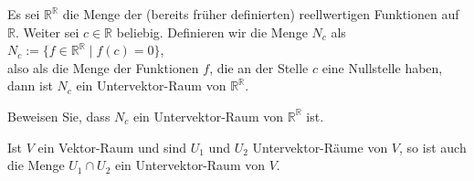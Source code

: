 \example
Es sei $\mathbb{R}^{\mathbb{R}}$ die Menge der (bereits fr\"{u}her definierten) reellwertigen Funktionen
auf $\mathbb{R}$.
Weiter sei $c \in \mathbb{R}$ beliebig.  Definieren wir die Menge $N_c$ als
\\[0.2cm]
\hspace*{1.3cm}
$N_c := \{ f \in \mathbb{R}^{\mathbb{R}} \mid f(c) = 0 \}$,
\\[0.2cm]
also als die Menge der Funktionen $f$, die an der Stelle $c$ eine Nullstelle haben, dann ist
$N_c$ ein Untervektor-Raum von $\mathbb{R}^{\mathbb{R}}$.

\exercise
Beweisen Sie, dass $N_c$ ein Untervektor-Raum von $\mathbb{R}^{\mathbb{R}}$ ist.
\eoxs

\begin{Satz}
  Ist $V$ ein Vektor-Raum und sind $U_1$ und $U_2$ Untervektor-R\"{a}ume von $V$, so ist auch die Menge
  $U_1 \cap U_2$ ein Untervektor-Raum von $V$.
\end{Satz}

